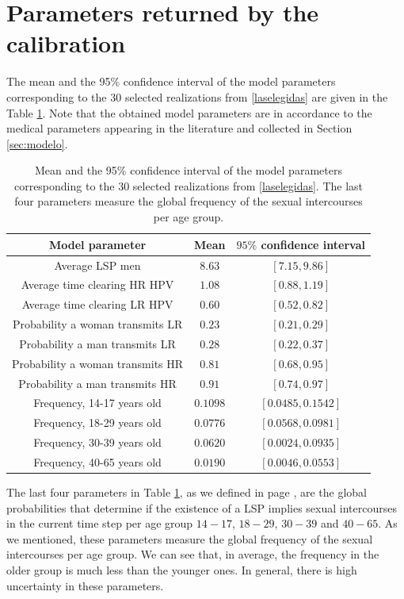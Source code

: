 \section{Parameters returned by the calibration}

The mean and the 95\% confidence interval of the model parameters corresponding to the $30$ selected realizations from \eqref{laselegidas} are given in the Table \ref{table:laselegidas}. Note that the obtained model parameters are in accordance to the medical parameters appearing in the literature and collected in Section \ref{sec:modelo}. 

\begin{table}[!h]
	\begin{center}
		\begin{tabular}{|c|c|c|}
			\hline 
			Model parameter & Mean & $95\%$ confidence interval  \\ 
			\hline 
			Average LSP men & $8.63$ & $ [ 7.15 ,  9.86 ]$  \\ 
			Average time clearing HR HPV & $1.08$ &  $[ 0.88 ,  1.19 ]$ \\ 
			Average time clearing LR HPV &  $0.60$ & $ [ 0.52 ,  0.82 ]$\\ 
			Probability a woman transmits LR &  $0.23$ &  $[ 0.21 ,  0.29 ]$\\ 
			Probability a man transmits LR &  $0.28$ &  $[ 0.22 ,  0.37 ]$\\ 
			Probability a woman transmits HR &  $0.81$ & $[ 0.68 ,  0.95 ]$\\ 
			Probability a man transmits HR &  $0.91$ & $[ 0.74 ,  0.97 ]$ \\
			Frequency, 14-17 years old & $0.1098$ & $ [0.0485, 0.1542]$ \\
			Frequency, 18-29 years old & $0.0776$ & $[0.0568, 0.0981]$ \\
			Frequency, 30-39 years old & $0.0620$ & $[0.0024, 0.0935]$ \\
			Frequency, 40-65 years old & $0.0190$ & $[0.0046, 0.0553]$ \\
			\hline
		\end{tabular}
	\end{center} 	
	\caption{Mean and the 95\% confidence interval of the model parameters corresponding to the $30$ selected realizations from \eqref{laselegidas}. The last four parameters measure the global frequency of the sexual intercourses per age group. }
	\label{table:laselegidas}
\end{table}

The last four parameters in Table \ref{table:laselegidas}, as we defined in page \pageref{las_T}, are the global probabilities that determine if the existence of a LSP implies sexual intercourses in the current time step per age group $14-17$, $18-29$, $30-39$ and $40-65$. As we mentioned, these parameters measure the global frequency of the sexual intercourses per age group. We can see that, in average, the frequency in the older group is much less than the younger ones. In general, there is high uncertainty in these parameters.

